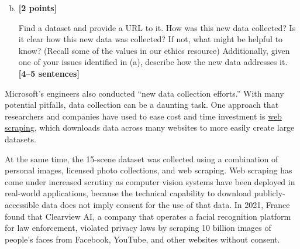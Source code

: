 \begin{enumerate}[(a)]
    \setcounter{enumi}{1}
    \item \textbf{[2 points]}
    \begin{tcolorbox}[colback=orange!5!white,colframe=orange!75!black]
     
    Find a dataset and provide a URL to it. How was this new data collected? 
    Is it clear how this new data was collected? If not, what might be helpful to know? (Recall some of the values in our ethics resource) Additionally, given one of your issues identified in (a), describe how the new data addresses it. \textbf{[4--5 sentences]}
    \end{tcolorbox}

\end{enumerate}

\pagebreak
Microsoft's engineers also conducted ``new data collection efforts.'' With many potential pitfalls, data collection can be a daunting task.
One approach that researchers and companies have used to ease cost and time investment is 
\href{https://en.wikipedia.org/wiki/Web_scraping#}{web scraping}, which downloads data across many websites to more easily create large datasets. 

At the same time, the 15-scene dataset was collected using a combination of personal images, licensed photo collections, and web scraping. Web scraping has come under increased scrutiny as computer vision systems have been deployed in real-world applications, because the technical capability to download publicly-accessible data does not imply consent for the use of that data. In 2021, France found that Clearview AI, a company that operates a facial recognition platform for law enforcement, violated privacy laws by scraping 10 billion images of people’s faces from Facebook, YouTube, and other websites without consent.


